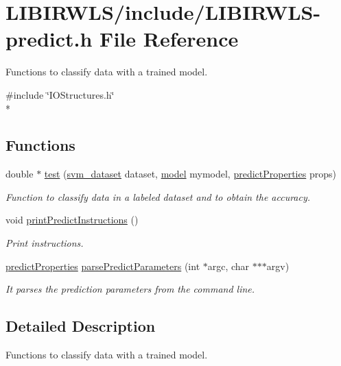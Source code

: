 \hypertarget{LIBIRWLS-predict_8h}{}\section{L\+I\+B\+I\+R\+W\+L\+S/include/\+L\+I\+B\+I\+R\+W\+L\+S-\/predict.h File Reference}
\label{LIBIRWLS-predict_8h}


Functions to classify data with a trained model.  


{\ttfamily \#include \char`\"{}I\+O\+Structures.\+h\char`\"{}}\\*
\subsection*{Functions}
\begin{DoxyCompactItemize}
\item 
double $\ast$ \hyperlink{LIBIRWLS-predict_8h_ae3fc6988def0487bb4bb47b759ba3d0b}{test} (\hyperlink{structsvm__dataset}{svm\+\_\+dataset} dataset, \hyperlink{structmodel}{model} mymodel, \hyperlink{structpredictProperties}{predict\+Properties} props)
\begin{DoxyCompactList}\small\item\em Function to classify data in a labeled dataset and to obtain the accuracy. \end{DoxyCompactList}\item 
void \hyperlink{LIBIRWLS-predict_8h_a53efcb64ca8e76d4a2cb65991189af91}{print\+Predict\+Instructions} ()
\begin{DoxyCompactList}\small\item\em Print instructions. \end{DoxyCompactList}\item 
\hyperlink{structpredictProperties}{predict\+Properties} \hyperlink{LIBIRWLS-predict_8h_a186e63263bf147110137e90adafcb8c7}{parse\+Predict\+Parameters} (int $\ast$argc, char $\ast$$\ast$$\ast$argv)
\begin{DoxyCompactList}\small\item\em It parses the prediction parameters from the command line. \end{DoxyCompactList}\end{DoxyCompactItemize}


\subsection{Detailed Description}
Functions to classify data with a trained model. 

